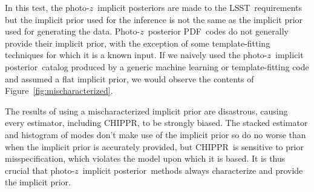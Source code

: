 \documentclass[iop]{emulateapj}
\newcommand{\Fig}[1]{Figure~\ref{#1}}
\newcommand{\project}[1]{\textsc{#1}}
\newcommand{\lsst}{\project{LSST}}
\newcommand{\Chippr}{\project{CHIPPR}}
\newcommand{\pz}{photo-$z$}
\newcommand{\Pz}{Photo-$z$}
\newcommand{\Pzpdf}{\Pz\ posterior PDF}
\newcommand{\pzip}{\pz\ implicit posterior}
\begin{document}
In this test, the \pzip s are made to the \lsst\ requirements but the implicit prior used for the inference is not the same as the implicit prior used for generating the data.
\Pzpdf\ codes do not generally provide their implicit prior, with the exception of some template-fitting techniques for which it is a known input.
If we naively used the \pzip\ catalog produced by a generic machine learning or template-fitting code and assumed a flat implicit prior, we would observe the contents of \Fig{fig:mischaracterized}.

The results of using a mischaracterized implicit prior are disastrous, causing every estimator, including \Chippr, to be strongly biased.
The stacked estimator and histogram of modes don't make use of the implicit prior so do no worse than when the implicit prior is accurately provided, but \Chippr\ is sensitive to prior misspecification, which violates the model upon which it is based.
It is thus crucial that \pzip\ methods always characterize and provide the implicit prior.
\end{document}
